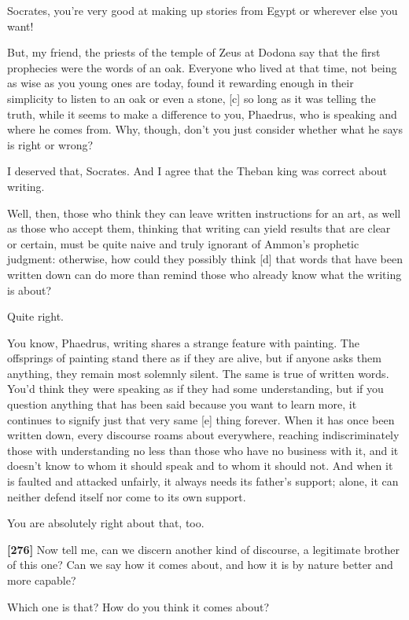 \sayphaedrus Socrates, you're very good at making up stories from Egypt or
wherever else you want!

\saysocrates But, my friend, the priests of the temple of Zeus at Dodona
say that the first prophecies were the words of an oak. Everyone who
lived at that time, not being as wise as you young ones are today, found
it rewarding enough in their simplicity to listen to an oak or even a
stone, {[}c{]} so long as it was telling the truth, while it seems to
make a difference to you, Phaedrus, who is speaking and where he comes
from. Why, though, don't you just consider whether what he says is right
or wrong?

\sayphaedrus I deserved that, Socrates. And I agree that the Theban king
was correct about writing.

\saysocrates Well, then, those who think they can leave written
instructions for an art, as well as those who accept them, thinking that
writing can yield results that are clear or certain, must be quite naive
and truly ignorant of Ammon's prophetic judgment: otherwise, how could
they possibly think {[}d{]} that words that have been written down can
do more than remind those who already know what the writing is about?

\sayphaedrus Quite right.

\saysocrates You know, Phaedrus, writing shares a strange feature with
painting. The offsprings of painting stand there as if they are alive,
but if anyone asks them anything, they remain most solemnly silent. The
same is true of written words. You'd think they were speaking as if they
had some understanding, but if you question anything that has been said
because you want to learn more, it continues to signify just that very
same {[}e{]} thing forever. When it has once been written down, every
discourse roams about everywhere, reaching indiscriminately those with
understanding no less than those who have no business with it, and it
doesn't know to whom it should speak and to whom it should not. And when
it is faulted and attacked unfairly, it always needs its father's
support; alone, it can neither defend itself nor come to its own
support.

\sayphaedrus You are absolutely right about that, too.

{\bf {[}276{]}} \saysocrates Now tell me, can we discern another kind of
discourse, a legitimate brother of this one? Can we say how it comes
about, and how it is by nature better and more capable?

\sayphaedrus Which one is that? How do you think it comes about?

